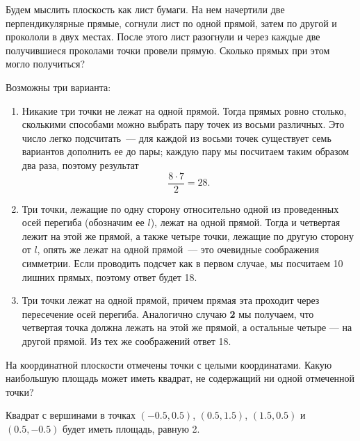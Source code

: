 ﻿


\begin{itemize}

\itB Будем мыслить плоскость как лист бумаги. На нем начертили две перпендикулярные прямые, 
согнули лист по одной прямой, затем по другой и прокололи в двух местах. После этого лист 
разогнули и через каждые две получившиеся проколами точки провели прямую. Сколько прямых при 
этом могло получиться?

\itr Возможны три варианта:

\begin{enumerate}
\item Никакие три точки не лежат на одной прямой. Тогда прямых ровно столько, сколькими 
способами можно выбрать пару точек из восьми различных. Это число легко подсчитать~--- 
для каждой из восьми точек существует семь вариантов дополнить ее до пары;  каждую пару 
мы посчитаем таким образом два раза, поэтому результат
$$
\frac{8\cdot 7}{2}=28.
$$

\item Три точки, лежащие по одну сторону относительно одной из проведенных осей перегиба 
(обозначим ее $l$), лежат на одной прямой. Тогда и четвертая лежит на этой же прямой, 
а также четыре точки, лежащие по другую сторону от $l$, опять же лежат на одной прямой~--- 
это очевидные соображения симметрии. Если проводить подсчет как в первом случае, мы 
посчитаем 10 лишних прямых, поэтому ответ будет 18.

\item Три точки лежат на одной прямой, причем прямая эта проходит через пересечение осей 
перегиба. Аналогично случаю {\bfseries 2} мы получаем, что четвертая точка должна лежать на этой же 
прямой, а остальные четыре --- на другой прямой. Из тех же соображений ответ 18.
\end{enumerate}

\itC На координатной плоскости отмечены точки с целыми координатами. Какую 
наибольшую площадь может иметь квадрат, не содержащий ни одной отмеченной точки?

\itr Квадрат с вершинами в точках $(-0.5,0.5)$, $(0.5,1.5)$, $(1.5,0.5)$ и $(0.5,-0.5)$ 
будет иметь площадь, равную 2.

\begin{center}\end{center}


\end{itemize}
